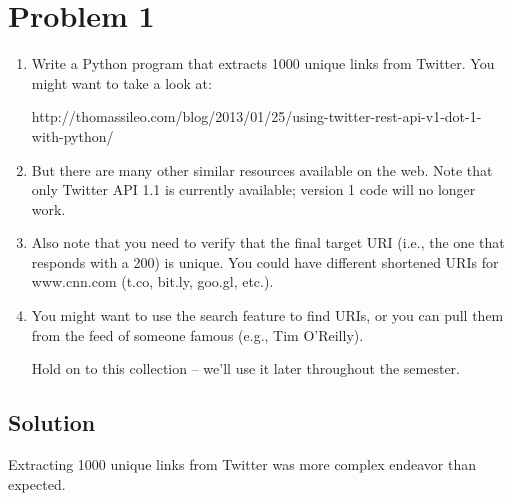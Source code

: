  
\section{Problem 1}
\label{part1}
\begin{enumerate}
\item Write a Python program that extracts 1000 unique links from
Twitter.  You might want to take a look at:

http://thomassileo.com/blog/2013/01/25/using-twitter-rest-api-v1-dot-1-with-python/

\item But there are many other similar resources available on the web.  Note
that only Twitter API 1.1 is currently available; version 1 code will
no longer work.

\item Also note that you need to verify that the final target URI (i.e., the
one that responds with a 200) is unique.  You could have different
shortened URIs for www.cnn.com (t.co, bit.ly, goo.gl, etc.).

\item You might want to use the search feature to find URIs, or you can
pull them from the feed of someone famous (e.g., Tim O'Reilly).

Hold on to this collection -- we'll use it later throughout the semester.
\end{enumerate}

\subsection{Solution}

Extracting 1000 unique links from Twitter was more complex endeavor than expected. 

